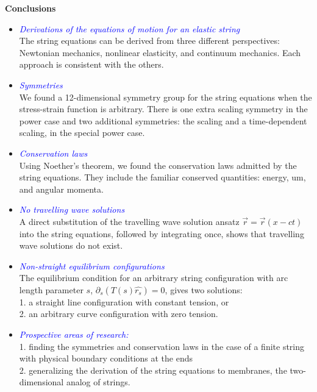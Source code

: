 \documentclass[landscape]{slides}
\def\myemph#1{\textcolor{blue}{\em #1}}
\begin{document}
\newpage
\begin{center}
\textbf{Conclusions}
\end{center}

\begin{itemize}
\item
\myemph{Derivations of the equations of motion for an elastic string}
\\
The string equations can be derived from three different perspectives: 
Newtonian mechanics, nonlinear elasticity, and continuum mechanics. 
Each approach is consistent with the others.
\item 
\myemph{Symmetries}
\\
We found a 12-dimensional symmetry group for the string equations when the stress-strain function is arbitrary.
There is one extra scaling symmetry in the power case and two additional symmetries: 
the scaling and a time-dependent scaling, in the special power case.
\item
\myemph{Conservation laws}
\\
Using Noether's theorem, we found the conservation laws admitted by the string equations. They include the familiar conserved quantities: energy, um, and angular momenta.
\newpage
\item
\myemph{No travelling wave solutions}
\\
A direct substitution of the travelling wave solution ansatz $\vec{r} = \vec{r}(x - ct)$ into the string equations, followed by integrating once, shows that travelling wave solutions do not exist. 
\item 
\myemph{Non-straight equilibrium configurations}
\\
The equilibrium condition for an arbitrary string configuration with arc length parameter $s$, $\partial_s (T(s)\widehat{r_s}) = 0$, gives two solutions:
\\
1. a straight line configuration with constant tension, or
\\
2. an arbitrary curve configuration with zero tension. 
\item  
\myemph{Prospective areas of research:}
\\
1. finding the symmetries and conservation laws in the case of a finite string with physical boundary conditions at the ends 
\\
2. generalizing the derivation of the string equations to membranes, the two-dimensional analog of strings.
\end{itemize}
\end{document}
